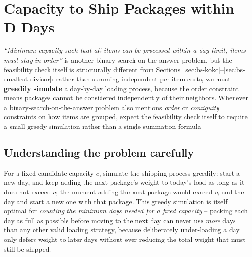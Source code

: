 \section{Capacity to Ship Packages within D Days}
\label{sec:bs-ship-packages}


\begin{patternbox}
\emph{``Minimum capacity such that all items can be processed within a day
limit, items must stay in order''} is another binary-search-on-the-answer
problem, but the feasibility check itself is structurally different from
Sections~\ref{sec:bs-koko}--\ref{sec:bs-smallest-divisor}: rather than
summing independent per-item costs, we must \textbf{greedily simulate} a
day-by-day loading process, because the order constraint means packages
cannot be considered independently of their neighbors. Whenever a
binary-search-on-the-answer problem also mentions \emph{order} or
\emph{contiguity} constraints on how items are grouped, expect the
feasibility check itself to require a small greedy simulation rather than
a single summation formula.
\end{patternbox}

\subsection*{Understanding the problem carefully}

For a fixed candidate capacity $c$, simulate the shipping process greedily:
start a new day, and keep adding the next package's weight to today's load
as long as it does not exceed $c$; the moment adding the next package
would exceed $c$, end the day and start a new one with that package. This
greedy simulation is itself optimal for \emph{counting the minimum days
needed for a fixed capacity} -- packing each day as full as possible before
moving to the next day can never use \emph{more} days than any other valid
loading strategy, because deliberately under-loading a day only defers
weight to later days without ever reducing the total weight that must
still be shipped.

